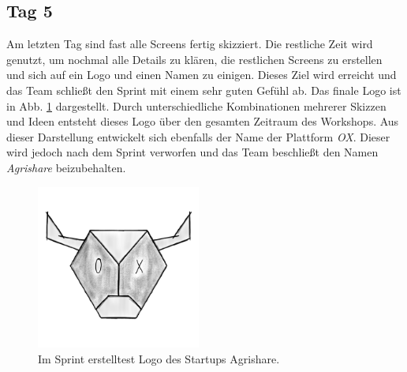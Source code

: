 \subsection*{\label{sec:Sprint-Umsetzung-Tag5}\thesubsection\quad Tag 5}Am letzten Tag sind fast alle Screens fertig skizziert. Die restliche Zeit wird genutzt, um nochmal alle Details zu klären, die restlichen Screens zu erstellen und sich auf ein Logo und einen Namen zu einigen. Dieses Ziel wird erreicht und das Team schließt den Sprint mit einem sehr guten Gefühl ab. Das finale Logo ist in Abb. \ref{fig:logoAgrishare} dargestellt. Durch unterschiedliche Kombinationen mehrerer Skizzen und Ideen entsteht dieses Logo über den gesamten Zeitraum des Workshops. Aus dieser Darstellung entwickelt sich ebenfalls der Name der Plattform \textit{OX}. Dieser wird jedoch nach dem Sprint verworfen und das Team beschließt den Namen \textit{Agrishare} beizubehalten. 
\begin{figure}
	\begin{center}
		\includegraphics[width=0.48\textwidth]{99_IMG/03_Umsetzung/Skizzeheller.png}
	\end{center}
  \caption{Im Sprint erstelltest Logo des Startups Agrishare.}
		\label{fig:logoAgrishare}
\end{figure}

